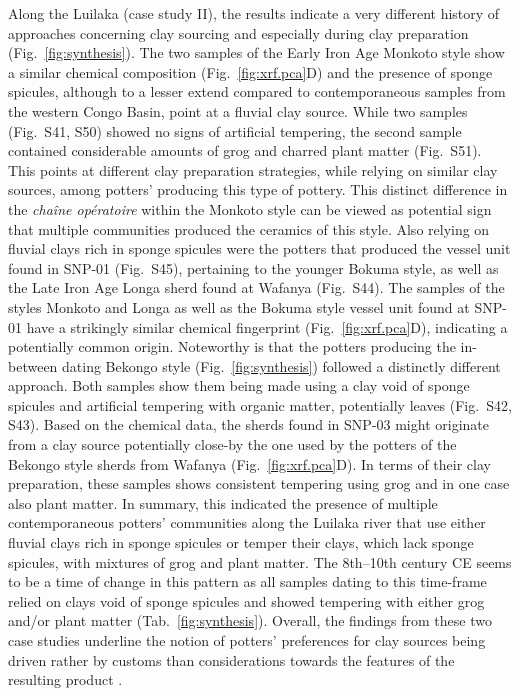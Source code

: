 \documentclass[preprint,10pt,oneside,onecolumn,authoryear]{elsarticle}
\begin{document}
Along the Luilaka (case study II), the results indicate a very different history of approaches concerning clay sourcing and especially during clay preparation (Fig.~\ref{fig:synthesis}). The two samples of the Early Iron Age Monkoto style show a similar chemical composition (Fig.~\ref{fig:xrf.pca}D) and the presence of sponge spicules, although to a lesser extend compared to contemporaneous samples from the western Congo Basin, point at a fluvial clay source. While two samples (Fig.~S41, S50) showed no signs of artificial tempering, the second sample contained considerable amounts of grog and charred plant matter (Fig.~S51). This points at different clay preparation strategies, while relying on similar clay sources, among potters' producing this type of pottery. This distinct difference in the \textit{chaîne opératoire} within the Monkoto style can be viewed as potential sign that multiple communities produced the ceramics of this style. Also relying on fluvial clays rich in sponge spicules were the potters that produced the vessel unit found in SNP-01 (Fig.~S45), pertaining to the younger Bokuma style, as well as the Late Iron Age Longa sherd found at Wafanya (Fig.~S44). The samples of the styles Monkoto and Longa as well as the Bokuma style vessel unit found at SNP-01 have a strikingly similar chemical fingerprint (Fig.~\ref{fig:xrf.pca}D), indicating a potentially common origin. Noteworthy is that the potters producing the in-between dating Bekongo style (Fig.~\ref{fig:synthesis}) followed a distinctly different approach. Both samples show them being made using a clay void of sponge spicules and artificial tempering with organic matter, potentially leaves (Fig.~S42, S43). Based on the chemical data, the sherds found in SNP-03 might originate from a clay source potentially close-by the one used by the potters of the Bekongo style sherds from Wafanya (Fig.~\ref{fig:xrf.pca}D). In terms of their clay preparation, these samples shows consistent tempering using grog and in one case also plant matter. In summary, this indicated the presence of multiple contemporaneous potters' communities along the Luilaka river that use either fluvial clays rich in sponge spicules or temper their clays, which lack sponge spicules, with mixtures of grog and plant matter. The 8th--10th century CE seems to be a time of change in this pattern as all samples dating to this time-frame relied on clays void of sponge spicules and showed tempering with either grog and/or plant matter (Tab.~\ref{fig:synthesis}). Overall, the findings from these two case studies underline the notion of potters' preferences for clay sources being driven rather by customs than considerations towards the features of the resulting product  \citep{Day.2004}.
\end{document}
